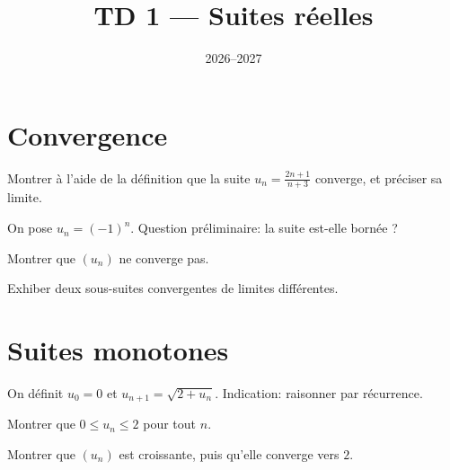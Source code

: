\documentclass[11pt]{ocots-td}
\title{TD 1 --- Suites réelles}
\date{2026--2027}
\begin{document}
\maketitle

\section{Convergence}

\begin{exercise}
    Montrer à l'aide de la définition que la suite $u_n = \frac{2n + 1}{n + 3}$
    converge, et préciser sa limite.
\end{exercise}

\begin{exercise}
    On pose $u_n = (-1)^n$. Question préliminaire: la suite est-elle bornée ?
    \begin{question}
        Montrer que $(u_n)$ ne converge pas.
    \end{question}
    \begin{question}
        Exhiber deux sous-suites convergentes de limites différentes.
    \end{question}
\end{exercise}

\section{Suites monotones}

\begin{exercise}
    On définit $u_0 = 0$ et $u_{n+1} = \sqrt{2 + u_n}$. Indication: raisonner
    par récurrence.
    \begin{question}
        Montrer que $0 \le u_n \le 2$ pour tout $n$.
    \end{question}
    \begin{question}
        Montrer que $(u_n)$ est croissante, puis qu'elle converge vers $2$.
    \end{question}
\end{exercise}
\end{document}

